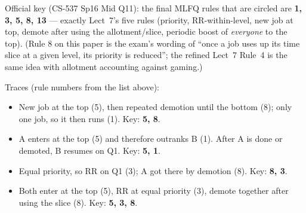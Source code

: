 \documentclass[11pt,a4paper]{article}
\newenvironment{Sol}{%
  \begin{tcolorbox}[sboxstyle, title={Solution}]%
}{%
  \end{tcolorbox}\vspace{0.35em}%
}
\begin{document}
\begin{Sol}
Official key (CS-537 Sp16 Mid Q11): the final MLFQ rules that are circled are \textbf{1, 3, 5, 8, 13} --- exactly Lect~7's five rules (priority, RR-within-level, new job at top, demote after using the allotment/slice, periodic boost of \emph{everyone} to the top). (Rule 8 on this paper is the exam's wording of ``once a job uses up its time slice at a given level, its priority is reduced''; the refined Lect~7 Rule~4 is the same idea with allotment accounting against gaming.)

Traces (rule numbers from the list above):
\begin{itemize}
  \item[(i)] New job at the top (5), then repeated demotion until the bottom (8); only one job, so it then runs (1). Key: \textbf{5, 8}.
  \item[(ii)] A enters at the top (5) and therefore outranks B (1). After A is done or demoted, B resumes on Q1. Key: \textbf{5, 1}.
  \item[(iii)] Equal priority, so RR on Q1 (3); A got there by demotion (8). Key: \textbf{8, 3}.
  \item[(iv)] Both enter at the top (5), RR at equal priority (3), demote together after using the slice (8). Key: \textbf{5, 3, 8}.
\end{itemize}
\end{Sol}
\end{document}
